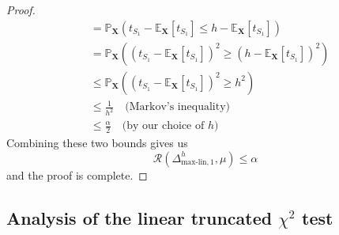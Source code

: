 \documentclass{article}
\newcommand{\X}{\mathbf{X}}
\newcommand{\bbP}{\mathbb{P}}
\newcommand{\cR}{\mathcal{R}}
\newcommand{\EE}{\mathbb{E}}
\newcommand{\linmax}{\text{max-lin}}
\theoremstyle{remark}
\begin{document}
\begin{proof}
\begin{align*}
        &= \bbP_\X(t_{S_1} -  \EE_{\X} [t_{S_1}]\leq h - \EE_{\X} [t_{S_1}]) \\
        &= \bbP_\X((t_{S_1} -  \EE_{\X} [t_{S_1 }])^2\geq (h - \EE_{\X} [t_{S_1 }])^2) \\
        &\leq \bbP_\X((t_{S_1} -  \EE_{\X} [t_{S_1}])^2\geq h^2) \\
        &\leq \frac{1}{h^2} \quad \text{(Markov's inequality)} \\
        &\leq \frac{\alpha}{2} \quad \text{(by our choice of $h$)}
    \end{align*}
    Combining these two bounds gives us 
    \[\cR(\Delta_{\linmax, 1}^h, \mu) \leq \alpha\]
    and the proof is complete.
\end{proof}

\subsection{Analysis of the linear truncated $\chi^2$ test}
\end{document}
